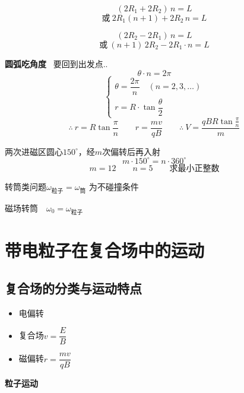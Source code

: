 \[ (2R_1+2R_2)\,n=L \]
\[ \text{或}\ 2R_1(n+1)+2R_2\,n=L \]

\[ (2R_2-2R_1)\,n=L \]
\[ \text{或}\ (n+1)\,2R_2-2R_1\cdot n=L \]

\textbf{圆弧吃角度}\ 
要回到出发点..
\[ \theta\cdot n=2\pi \]
\[ \begin{cases}\theta=\dfrac{2\pi}{n}\quad(n=2,3,\dots)\\[1ex] r=R\cdot\tan\dfrac{\theta}{2}\end{cases} \]
\[ \therefore\ r=R\tan\frac{\pi}{n}\qquad r=\frac{mv}{qB}\qquad \therefore\ V=\frac{qBR\tan\frac{\pi}{n}}{m} \]

\begin{keybox}[圆约束]
两次进磁区圆心$150^\circ$，经$m$次偏转后再入射
\[ m\cdot150^\circ=n\cdot360^\circ \]
\[ m=12\qquad n=5\qquad \text{求最小正整数} \]
\end{keybox}

转筒类问题\quad $\omega_{\text{粒子}}=\omega_{\text{筒}}$ 为不碰撞条件 %

磁场转筒　$\omega_0=\omega_{\text{粒子}}$ %


\section{带电粒子在复合场中的运动}
\subsection{复合场的分类与运动特点}
\begin{itemize}
\item 电偏转\ 
\item 复合场\quad $v=\dfrac{E}{B}$
\item 磁偏转\quad $r=\dfrac{mv}{qB}$
\end{itemize}

\textbf{粒子运动}

